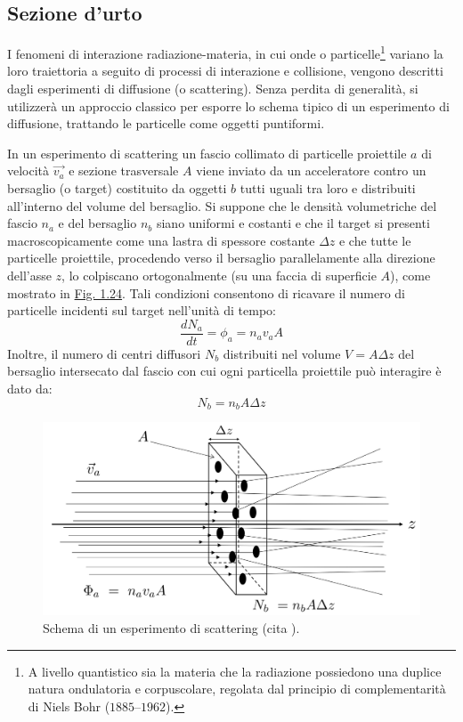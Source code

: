 \documentclass[12pt,a4paper,twoside]{report}
\begin{document}
	\subsection{Sezione d'urto}
	I fenomeni di interazione radiazione-materia, in cui onde o particelle\footnote{A livello quantistico sia la materia che la radiazione possiedono una duplice natura ondulatoria e corpuscolare, regolata dal principio di complementarità di Niels Bohr ($1885$--$1962$).} variano la loro traiettoria a seguito di processi di interazione e collisione, vengono descritti dagli esperimenti di diffusione (o scattering). Senza perdita di generalità, si utilizzerà un approccio classico per esporre lo schema tipico di un esperimento di diffusione, trattando le particelle come oggetti puntiformi.
	
	In un esperimento di scattering un fascio collimato di particelle proiettile $a$ di velocità $\vec{v_a}$ e sezione trasversale $A$ viene inviato da un acceleratore contro un bersaglio (o target) costituito da oggetti $b$ tutti uguali tra loro e distribuiti all'interno del volume del bersaglio. Si suppone che le densità volumetriche del fascio $n_a$ e del bersaglio $n_b$ siano uniformi e costanti e che il target si presenti macroscopicamente come una lastra di spessore costante $\Delta z$ e che tutte le particelle proiettile, procedendo verso il bersaglio parallelamente alla direzione dell'asse $z$, lo colpiscano ortogonalmente (su una faccia di superficie $A$), come mostrato in \hyperref[fig:scattering]{Fig. 1.24}. Tali condizioni consentono di ricavare il numero di particelle incidenti sul target nell'unità di tempo:
	\begin{equation}
		\frac{dN_a}{dt}=\phi_a=n_av_aA
		\label{eq:scattering1}
	\end{equation}
	Inoltre, il numero di centri diffusori $N_b$ distribuiti nel volume $V=A\Delta z$ del bersaglio intersecato dal fascio con cui ogni particella proiettile può interagire è dato da:
	\begin{equation}
		N_b=n_bA\Delta z
		\label{eq:scattering2}
	\end{equation}
	
	\begin{figure}[H]
		\centering
		\includegraphics[width=0.9\linewidth]{scattering.jpg}
		\caption{Schema di un esperimento di scattering (cita
			).}
		\label{fig:scattering}
	\end{figure}
	
\end{document}
